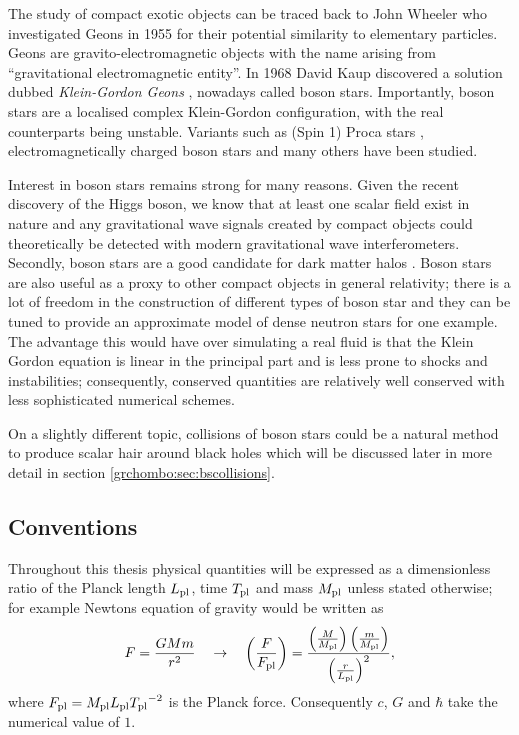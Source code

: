 The study of compact exotic objects can be traced back to John Wheeler who investigated Geons in 1955 for their potential similarity to elementary particles. Geons are gravito-electromagnetic objects with the name arising from \enquote{gravitational electromagnetic entity}. In 1968 David Kaup discovered a solution dubbed {\it Klein-Gordon Geons} \cite{Kaup:1968zz}, nowadays called boson stars. Importantly, boson stars are a localised complex Klein-Gordon configuration, with the real counterparts being unstable. Variants such as (Spin 1) Proca stars \cite{brito2016proca}, electromagnetically charged boson stars and many others have been studied.

Interest in boson stars remains strong for many reasons. Given the recent discovery
of the Higgs boson, we know that at least one scalar field exist in nature and any
gravitational wave signals created by compact objects could theoretically be detected
with modern gravitational wave interferometers. Secondly, boson stars are a good
candidate for dark matter halos \cite{lee1996galactic} \cite{schunck2003general}.
Boson stars are also useful as a proxy to other compact objects in general relativity;
there is a lot of freedom in the construction of different types of boson star
and they can be tuned to provide an approximate model of dense neutron stars for
one example. The advantage this would have over simulating a real fluid is that
the Klein Gordon equation is linear in the principal part and
is less prone to shocks and instabilities; consequently, conserved
quantities are relatively well conserved with less sophisticated numerical schemes.

On a slightly different topic, collisions of boson stars could be a natural method
to produce scalar hair around black holes which will be discussed later in more
detail in section \ref{grchombo:sec:bscollisions}.

\subsection{Conventions} \label{intro:sec:conventions}
Throughout this thesis physical quantities will be expressed as a dimensionless ratio of the Planck length ${L_{\rm pl}}$, time ${T_{\rm pl}}$ and mass ${M_{\rm pl}}$ unless stated otherwise; for example Newtons equation of gravity would be written as
\begin{equation}
F=\frac{GMm}{r^2} \quad \rightarrow \quad\left(\frac{F}{{F_{\rm pl}}}\right) = \frac{\left(\frac{M}{{M_{\rm pl}}}\right)  \left(\frac{m}{{M_{\rm pl}}}\right)}{\left(\frac{r}{{L_{\rm pl}}}\right)^2},
\end{equation}
where ${F_{\rm pl}} = {M_{\rm pl}}{L_{\rm pl}}{T_{\rm pl}}^{-2}$ is the Planck force. Consequently $c$, $G$ and $\hbar$ take the numerical value of $1$.

